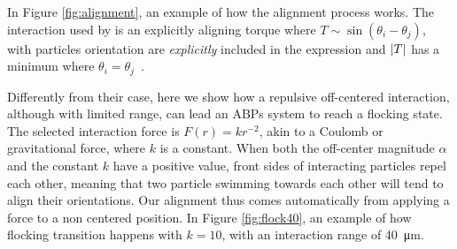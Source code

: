 \documentclass[../../master_thesis_np.tex]{subfiles}
\begin{document}
		In Figure \ref{fig:alignment}, an example of how the alignment process works. 
		The interaction used by \citeauthor{martin-gomez_collective_2018} is an explicitly aligning torque where $T \sim \sin( \theta_{i}-\theta_{j} )$, with particles orientation are \emph{explicitly} included in the expression and $\abs{T}$ has a minimum where $\theta_{i} = \theta_{j}$~\cite{martin-gomez_collective_2018}. 
		
		Differently from their case, here we show how a repulsive off-centered interaction, although with limited range, can lead an ABPs system to reach a flocking state. 
		The selected interaction force is $F(r) = kr^{-2}$, akin to a Coulomb or gravitational force, where $k$ is a constant. 
		When both the off-center magnitude $\alpha$ and the constant $k$ have a positive value, front sides of interacting particles repel each other, meaning that two particle swimming towards each other will tend to align their orientations. 
		Our alignment thus comes automatically from applying a force to a non centered position. 
		In Figure \ref{fig:flock40}, an example of how flocking transition happens with $k = 10$, with an interaction range of \SI{40}{\micro\meter}.
			
\end{document}
